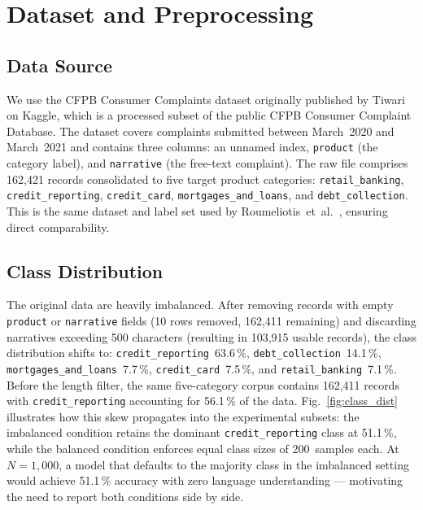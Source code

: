 \documentclass[a4paper,fleqn]{cas-dc}
\begin{document}
\section{Dataset and Preprocessing}
\label{sec:data}

\subsection{Data Source}

We use the CFPB Consumer Complaints dataset originally published by
Tiwari \cite{tiwari2021cfpb} on Kaggle, which is a processed subset
of the public CFPB Consumer Complaint Database. The dataset covers
complaints submitted between March~2020 and March~2021 and contains
three columns: an unnamed index, \texttt{product} (the category label),
and \texttt{narrative} (the free-text complaint). The raw file
comprises 162,421 records consolidated to five target product categories:
\texttt{retail\_banking}, \texttt{credit\_reporting},
\texttt{credit\_card}, \texttt{mortgages\_and\_loans}, and
\texttt{debt\_collection}. This is the same dataset and label set used
by Roumeliotis~et~al.\ \cite{roumeliotis2025think}, ensuring
direct comparability.

\subsection{Class Distribution}

The original data are heavily imbalanced. After removing records with
empty \texttt{product} or \texttt{narrative} fields (10 rows removed,
162,411 remaining) and discarding narratives exceeding 500 characters
(resulting in 103,915 usable records), the class distribution shifts
to: \texttt{credit\_reporting}~63.6\,\%,
\texttt{debt\_collection}~14.1\,\%,
\texttt{mortgages\_and\_loans}~7.7\,\%,
\texttt{credit\_card}~7.5\,\%, and
\texttt{retail\_banking}~7.1\,\%. Before the length filter, the same
five-category corpus contains 162,411 records with
\texttt{credit\_reporting} accounting for 56.1\,\% of the data.
Fig.~\ref{fig:class_dist} illustrates how this skew propagates into
the experimental subsets: the imbalanced condition retains the
dominant \texttt{credit\_reporting} class at 51.1\,\%, while the
balanced condition enforces equal class sizes of 200~samples each.
At $N{=}1{,}000$, a model that defaults to the majority class in the
imbalanced setting would achieve 51.1\,\% accuracy with zero
language understanding --- motivating the need to report both conditions
side by side.
\end{document}
